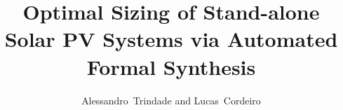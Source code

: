 \documentclass[journal,onecolumn]{IEEEtran}
\begin{document}
%
\title{Optimal Sizing of Stand-alone Solar PV Systems via Automated Formal Synthesis}
%
%
%

\author{Alessandro~Trindade and Lucas~Cordeiro}%

% 
%
\end{document}
